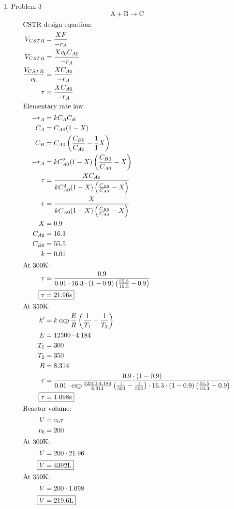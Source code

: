 \documentclass[12pt]{article}
\begin{document}
\begin{enumerate}
\newpage
    \item Problem 3
    \begin{equation*}
        \mathrm{A} + \mathrm{B} \rightarrow \mathrm{C}
    \end{equation*}
    \begin{align*}
        \intertext{CSTR design equation:}
        V_{CSTR} &= \frac{X F}{-r_A} \\
        V_{CSTR} &= \frac{X v_0 C_{A0}}{-r_A} \\
        \frac{V_{CSTR}}{v_0} &= \frac{X C_{A0}}{-r_A} \\
        \tau &= \frac{X C_{A0}}{-r_A} \\
        \intertext{Elementary rate law:}
        -r_A &= k C_A C_B \\
        C_A &= C_{A0} (1 - X) \\
        C_B &= C_{A0} \left( \frac{C_{B0}}{C_{A0}} - \frac{1}{1} X \right) \\
        -r_A &= k C_{A0}^2 (1 - X) \left( \frac{C_{B0}}{C_{A0}} - X \right) \\
        \tau &= \frac{X C_{A0}}{k C_{A0}^2 (1 - X) \left( \frac{C_{B0}}{C_{A0}} - X \right)} \\
        \tau &= \frac{X}{k C_{A0} (1 - X) \left( \frac{C_{B0}}{C_{A0}} - X \right)} \\
        X &= 0.9 \\
        C_{A0} &= 16.3 \\
        C_{B0} &= 55.5 \\
        k &= 0.01 \\
        \intertext{At 300K:}
        \tau &= \frac{0.9}{0.01 \cdot 16.3 \cdot (1 - 0.9) \left( \frac{55.5}{16.3} - 0.9 \right)} \\
        \Aboxed{\tau &= 21.96 \mathrm{s}} \\
        \intertext{At 350K:}
        k' &= k \exp{\frac{E}{R}\left( \frac{1}{T_1} - \frac{1}{T_2} \right)} \\
        E &= 12500 \cdot 4.184 \\
        T_1 &= 300 \\
        T_2 &= 350 \\
        R &= 8.314 \\
        \tau &= \frac{0.9 \cdot (1 - 0.9)}{0.01 \cdot \exp{\frac{12500 \cdot 4.184}{8.314}\left( \frac{1}{300} - \frac{1}{350} \right)} \cdot 16.3 \cdot (1 - 0.9) \left( \frac{55.5}{16.3} - 0.9 \right)} \\
        \Aboxed{\tau &= 1.098 \mathrm{s}} \\
        \intertext{Reactor volume:}
        V &= v_0 \tau \\
        v_0 &= 200 \\
        \intertext{At 300K:}
        V &= 200 \cdot 21.96 \\
        \Aboxed{V &= 4392 \mathrm{L}} \\
        \intertext{At 350K:}
        V &= 200 \cdot 1.098 \\
        \Aboxed{V &= 219.6 \mathrm{L}}
    \end{align*}


\end{enumerate}
\end{document}
